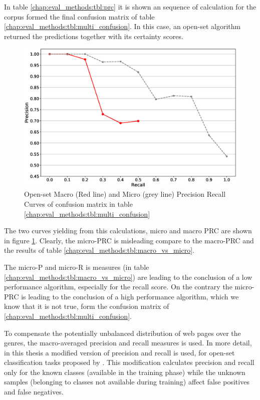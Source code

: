 In table \ref{chap:eval_methods:tbl:prc} it is shown an sequence of calculation for the corpus formed the final confusion matrix of table \ref{chap:eval_methods:tbl:multi_confusion}. In this case, an open-set algorithm returned the predictions together with its certainty scores. 

\begin{figure}[t]
	\begin{center}
    	\includegraphics[scale=0.45]{Figures/pr_macro_micro_example.eps}
		\caption{Open-set Macro (Red line) and Micro (grey line) Precision Recall Curves of confusion matrix in table \ref{chap:eval_methods:tbl:multi_confusion}}
		\label{chap:eval_methods:fig:prc_macro}
	\end{center}
\end{figure}

The two curves yielding from this calculations, micro and macro PRC are shown in figure \ref{chap:eval_methods:fig:prc_macro}. Clearly, the micro-PRC is misleading compare to the macro-PRC and the results of table \ref{chap:eval_methods:tbl:macro_vs_micro}. 

The micro-P and micro-R is measures (in table \ref{chap:eval_methods:tbl:macro_vs_micro}) are leading to the conclusion of a low performance algorithm, especially for the recall score. On the contrary the micro-PRC is leading to the conclusion of a high performance algorithm, which we know that it is not true, form the confusion matrix of \ref{chap:eval_methods:tbl:multi_confusion}.

To compensate the potentially unbalanced distribution of web pages over the genres, the macro-averaged precision and recall measures is used. In more detail, in this thesis a modified version of precision and recall is used, for open-set classification tasks proposed by \parencite{mendesjunior2016}. This modification calculates precision and recall only for the known classes (available in the training phase) while the unknown samples (belonging to classes not available during training) affect false positives and false negatives.

